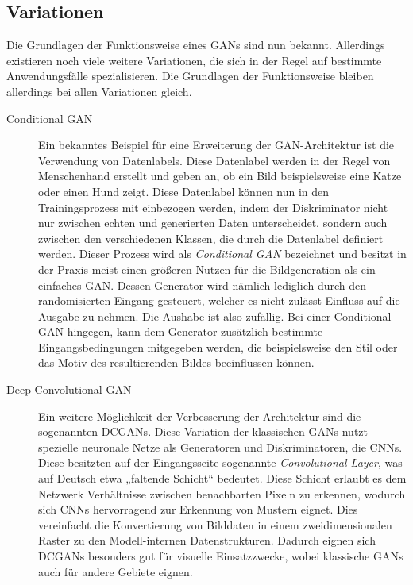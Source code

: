\subsection{Variationen}

\noindent Die Grundlagen der Funktionsweise eines \acp{GAN} sind nun bekannt. Allerdings existieren noch viele weitere Variationen, die sich in der Regel auf bestimmte Anwendungsfälle spezialisieren. Die Grundlagen der Funktionsweise bleiben allerdings bei allen Variationen gleich. \\

\begin{description}
    \item[Conditional GAN] Ein bekanntes Beispiel für eine Erweiterung der \ac{GAN}-Architektur ist die Verwendung von Datenlabels. Diese Datenlabel werden in der Regel von Menschenhand erstellt und geben an, ob ein Bild beispielsweise eine Katze oder einen Hund zeigt. Diese Datenlabel können nun in den Trainingsprozess mit einbezogen werden, indem der Diskriminator nicht nur zwischen echten und generierten Daten unterscheidet, sondern auch zwischen den verschiedenen Klassen, die durch die Datenlabel definiert werden. Dieser Prozess wird als \textit{Conditional GAN} bezeichnet und besitzt in der Praxis meist einen größeren Nutzen für die Bildgeneration als ein einfaches \ac{GAN}. Dessen Generator wird nämlich lediglich durch den randomisierten Eingang gesteuert, welcher es nicht zulässt Einfluss auf die Ausgabe zu nehmen. Die Aushabe ist also zufällig. Bei einer Conditional GAN hingegen, kann dem Generator zusätzlich bestimmte Eingangsbedingungen mitgegeben werden, die beispielsweise den Stil oder das Motiv des resultierenden Bildes beeinflussen können.

    \newpage

    \item[Deep Convolutional GAN] Ein weitere Möglichkeit der Verbesserung der Architektur sind die sogenannten \acp{DCGAN}. Diese Variation der klassischen \acp{GAN} nutzt spezielle neuronale Netze als Generatoren und Diskriminatoren, die \acp{CNN}. Diese besitzten auf der Eingangsseite sogenannte \textit{Convolutional Layer}, was auf Deutsch etwa „faltende Schicht“ bedeutet. Diese Schicht erlaubt es dem Netzwerk Verhältnisse zwischen benachbarten Pixeln zu erkennen, wodurch sich \acp{CNN} hervorragend zur Erkennung von Mustern eignet. Dies vereinfacht die Konvertierung von Bilddaten in einem zweidimensionalen Raster zu den Modell-internen Datenstrukturen. Dadurch eignen sich \acp{DCGAN} besonders gut für visuelle Einsatzzwecke, wobei klassische \acp{GAN} auch für andere Gebiete eignen. 


\end{description}

